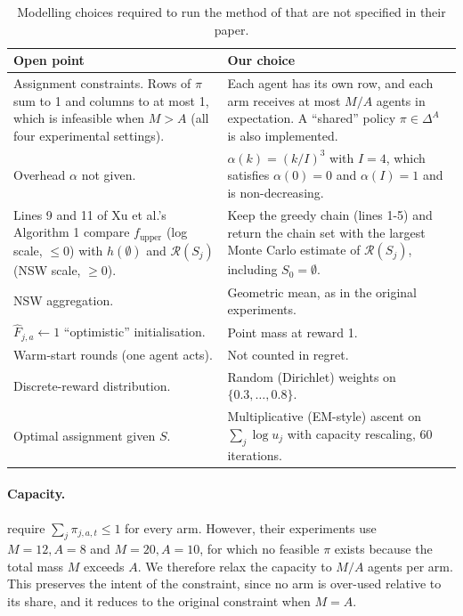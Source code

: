 \documentclass[letterpaper]{article}
\begin{document}
\begin{table}[t]
\caption{Modelling choices required to run the method of \citet{xu2026fair} that are not specified in their paper.}
\label{tab:choices}
\centering\small
\renewcommand{\arraystretch}{1.25}
\begin{tabular}{|>{\raggedright\arraybackslash}p{}|>{\raggedright\arraybackslash}p{}|}
\hline
\textbf{Open point} & \textbf{Our choice} \\
\hline
Assignment constraints. Rows of $\pi$ sum to 1 and columns to at most 1, which is infeasible when $M>A$ (all four experimental settings). & Each agent has its own row, and each arm receives at most $M/A$ agents in expectation. A ``shared'' policy $\pi\in\Delta^A$ \citep{jones2023efficient} is also implemented. \\
\hline
Overhead $\alpha$ not given. & $\alpha(k)=(k/I)^3$ with $I=4$, which satisfies $\alpha(0)=0$ and $\alpha(I)=1$ and is non-decreasing. \\
\hline
Lines 9 and 11 of Xu et al.'s Algorithm 1 compare $f_{\mathrm{upper}}$ (log scale, $\le 0$) with $h(\emptyset)$ and $\mathcal{R}(S_j)$ (NSW scale, $\ge 0$). & Keep the greedy chain (lines 1-5) and return the chain set with the largest Monte Carlo estimate of $\mathcal{R}(S_j)$, including $S_0=\emptyset$. \\
\hline
NSW aggregation. & Geometric mean, as in the original experiments. \\
\hline
$\hat F_{j,a}\leftarrow 1$ ``optimistic'' initialisation. & Point mass at reward 1. \\
\hline
Warm-start rounds (one agent acts). & Not counted in regret. \\
\hline
Discrete-reward distribution. & Random (Dirichlet) weights on $\{0.3,\dots,0.8\}$. \\
\hline
Optimal assignment given $S$. & Multiplicative (EM-style) ascent on $\sum_j\log u_j$ with capacity rescaling, 60 iterations. \\
\hline
\end{tabular}
\end{table}

\paragraph{Capacity.}
\citet{xu2026fair} require $\sum_j\pi_{j,a,t}\le1$ for every arm. However, their
experiments use $M=12,A=8$ and $M=20,A=10$, for which no feasible $\pi$ exists
because the total mass $M$ exceeds $A$. We therefore relax the capacity to $M/A$
agents per arm. This preserves the intent of the constraint, since no arm is
over-used relative to its share, and it reduces to the original constraint
when $M=A$.
\end{document}
